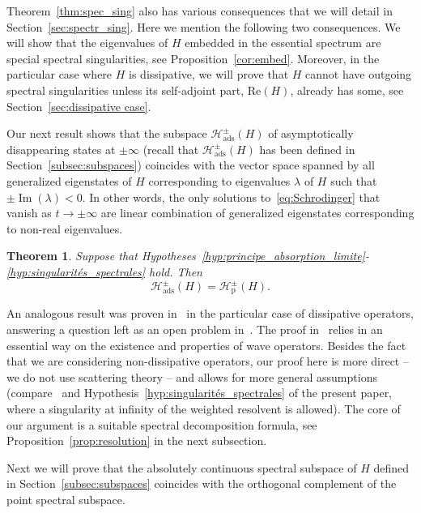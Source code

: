 \documentclass[10pt]{amsart}
\newtheorem{theo}{Theorem}[section]
\theoremstyle{definition}\newtheorem{defi}[theo]{Definition}\newtheorem{rema}[theo]{Remark}\newtheorem{exam}[theo]{Example}\newtheorem{exem}[theo]{Example}\newtheorem{nota}[theo]{Notation}
\newcommand{\Hi}{\mathcal{H}}
\newcommand{\rmp}{\mathrm{p}}
\newcommand{\ads}{\mathrm{ads}}
\DeclareMathOperator{\im}{Im}
\begin{document}
Theorem~\ref{thm:spec_sing} also has various consequences that we will detail in Section~\ref{sec:spectr_sing}. Here we mention the following two consequences. We will show that the eigenvalues of $H$ embedded in the essential spectrum are special spectral singularities, see Proposition~\ref{cor:embed}. Moreover, in the particular case where $H$ is dissipative, we will prove that $H$ cannot have outgoing spectral singularities unless its self-adjoint part, $\mathrm{Re}(H)$, already has some, see Section~\ref{sec:dissipative case}.


Our next result shows that the subspace $\Hi_\ads^\pm(H)$ of asymptotically disappearing states at $\pm\infty$ (recall that $\Hi_\ads^\pm(H)$ has been defined in Section~\ref{subsec:subspaces}) coincides with the vector space spanned by all generalized eigenstates of $H$ corresponding to eigenvalues $\lambda$ of $H$ such that $\pm\im(\lambda)<0$. In other words, the only solutions to~\eqref{eq:Schrodinger} that vanish as $t\to\pm\infty$ are linear combination of generalized eigenstates corresponding to non-real eigenvalues.

\begin{theo}\label{thm:caracterisation_etat_disparaissent_à_infini}
Suppose that Hypotheses~\ref{hyp:principe_absorption_limite}-\ref{hyp:singularités_spectrales} hold. Then
\begin{equation}
\Hi_\ads^\pm(H)=\Hi_\rmp^\pm(H).
\end{equation}
\end{theo}

An analogous result was proven in~\cite{FaFr18_01} in the particular case of dissipative operators, answering a question left as an open problem in~\cite{Da80_01}. The proof in~\cite{FaFr18_01} relies in an essential way on the existence and properties of wave operators. Besides the fact that we are considering non-dissipative operators, our proof here is more direct -- we do not use scattering theory -- and allows for more general assumptions (compare~\cite[Hypothesis 2.5]{FaFr18_01} and Hypothesis~\ref{hyp:singularités_spectrales} of the present paper, where a singularity at infinity of the weighted resolvent is allowed). The core of our argument is a suitable spectral decomposition formula, see Proposition~\ref{prop:resolution} in the next subsection.


Next we will prove that the absolutely continuous spectral subspace of $H$ defined in Section~\ref{subsec:subspaces} coincides with the orthogonal complement of the point spectral subspace.
\end{document}
